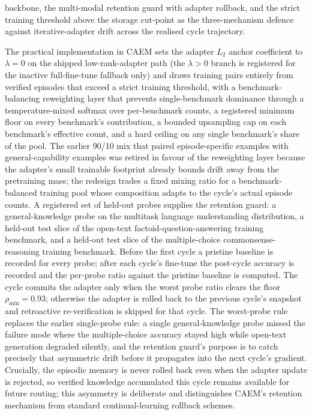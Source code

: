 backbone, the multi-modal retention guard with adapter rollback, and the strict training threshold above the storage cut-point as the three-mechanism defence against iterative-adapter drift across the realised cycle trajectory.

The practical implementation in CAEM sets the adapter $L_{2}$ anchor coefficient to $\lambda = 0$ on the shipped low-rank-adapter path (the $\lambda > 0$ branch is registered for the inactive full-fine-tune fallback only) and draws training pairs entirely from verified episodes that exceed a strict training threshold, with a benchmark-balancing reweighting layer that prevents single-benchmark dominance through a temperature-mixed softmax over per-benchmark counts, a registered minimum floor on every benchmark's contribution, a bounded upsampling cap on each benchmark's effective count, and a hard ceiling on any single benchmark's share of the pool. The earlier 90/10 mix that paired episode-specific examples with general-capability examples was retired in favour of the reweighting layer because the adapter's small trainable footprint already bounds drift away from the pretraining mass; the redesign trades a fixed mixing ratio for a benchmark-balanced training pool whose composition adapts to the cycle's actual episode counts. A registered set of held-out probes supplies the retention guard: a general-knowledge probe on the multitask language understanding distribution, a held-out test slice of the open-text factoid-question-answering training benchmark, and a held-out test slice of the multiple-choice commonsense-reasoning training benchmark. Before the first cycle a pristine baseline is recorded for every probe; after each cycle's fine-tune the post-cycle accuracy is recorded and the per-probe ratio against the pristine baseline is computed. The cycle commits the adapter only when the worst probe ratio clears the floor $\rho_{\min} = 0.93$; otherwise the adapter is rolled back to the previous cycle's snapshot and retroactive re-verification is skipped for that cycle. The worst-probe rule replaces the earlier single-probe rule: a single general-knowledge probe missed the failure mode where the multiple-choice accuracy stayed high while open-text generation degraded silently, and the retention guard's purpose is to catch precisely that asymmetric drift before it propagates into the next cycle's gradient. Crucially, the episodic memory is never rolled back even when the adapter update is rejected, so verified knowledge accumulated this cycle remains available for future routing; this asymmetry is deliberate and distinguishes CAEM's retention mechanism from standard continual-learning rollback schemes.

